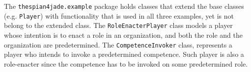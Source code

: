 The \texttt{thespian4jade.example} package holds classes that extend the base classes (e.g. \texttt{Player}) with functionality that is used in all three examples, yet is not belong to the extended class.
The \texttt{RoleEnacterPlayer} class models a player whose intention is to enact a role in an organization, and both the role and the organization are predetermined.
The \texttt{CompetenceInvoker} class, represents a player who intends to invoke a predetermined competence. Such player is also a role-enacter since the competence has to be invoked on some predetermined role.